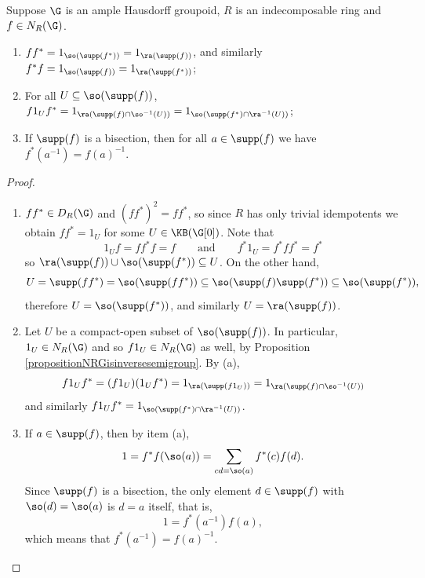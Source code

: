 \begin{lemma}\label{lemmanormalizerssteinbergalgebradiagonal2}
Suppose $\G$ is an ample Hausdorff groupoid, $R$ is an indecomposable ring and $f\in N_R(\G)$.
\begin{enumerate}
\item[(a)] $ff^*=1_{\so(\supp(f^*))}=1_{\ra(\supp(f))}$, and similarly $f^*f=1_{\so(\supp(f))}=1_{\ra(\supp(f^*))}$;
\item[(b)] For all $U\subseteq\so(\supp(f))$, $f1_Uf^*=1_{\ra(\supp(f)\cap\so^{-1}(U))}=1_{\so(\supp(f^*)\cap\ra^{-1}(U))}$;
\item[(c)] If $\supp(f)$ is a bisection, then for all $a\in\supp(f)$ we have $f^*(a^{-1})=f(a)^{-1}$.
\end{enumerate}
\end{lemma}
\begin{proof}
\begin{enumerate}
\item[(a)] $ff^*\in D_R(\G)$ and $(ff^*)^2=ff^*$, so since $R$ has only trivial idempotents we obtain $ff^*=1_U$ for some $U\in\KB(\G[0])$. Note that
\[1_Uf=ff^*f=f\qquad\text{and}\qquad f^*1_U=f^*ff^*=f^*\]
so $\ra(\supp(f))\cup \so(\supp(f^*))\subseteq U$. On the other hand,
\[U=\supp(ff^*)=\so(\supp(ff^*))\subseteq \so(\supp(f)\supp(f^*))\subseteq \so(\supp(f^*)),\]
therefore $U=\so(\supp(f^*))$, and similarly $U=\ra(\supp(f))$.
%
\item[(b)] Let $U$ be a compact-open subset of $\so(\supp(f))$. In particular, $1_U\in N_R(\G)$ and so $f1_U\in N_R(\G)$ as well, by Proposition \ref{propositionNRGisinversesemigroup}. By (a),
\[f1_Uf^*=(f1_U)(1_U f^*)=1_{\ra(\supp(f1_U))}=1_{\ra(\supp(f)\cap\so^{-1}(U))}\]
and similarly $f1_Uf^*=1_{\so(\supp(f^*)\cap\ra^{-1}(U))}$.
%
\item[(c)] If $a\in\supp(f)$, then by item (a),
\[1=f^*f(\so(a))=\sum_{cd=\so(a)}f^*(c)f(d).\]
Since $\supp(f)$ is a bisection, the only element $d\in\supp(f)$ with $\so(d)=\so(a)$ is $d=a$ itself, that is,
\[1=f^*(a^{-1})f(a),\]
which means that $f^*(a^{-1})=f(a)^{-1}$.\qedhere
\end{enumerate}
\end{proof}

